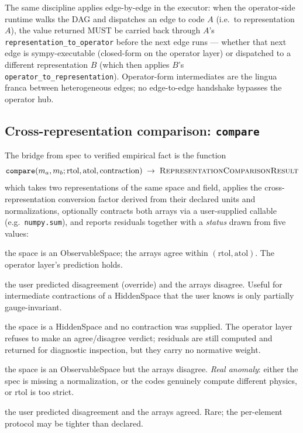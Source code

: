 \documentclass[11pt,a4paper]{article}
\begin{document}
The same discipline applies edge-by-edge in the executor: when the
operator-side runtime walks the DAG and dispatches an edge to code $A$
(i.e.\ to representation $A$), the value returned MUST be carried back
through $A$'s \texttt{representation\_to\_operator} before the
next edge runs --- whether that next edge is sympy-executable (closed-form
on the operator layer) or dispatched to a different representation $B$
(which then applies $B$'s
\texttt{operator\_to\_representation}). Operator-form intermediates
are the lingua franca between heterogeneous edges; no edge-to-edge handshake
bypasses the operator hub.

\subsection{Cross-representation comparison: \texttt{compare}}

The bridge from spec to verified empirical fact is the function
\begin{equation*}
  \texttt{compare}(m_a, m_b; \text{rtol}, \text{atol}, \text{contraction})
  \;\to\; \textsc{RepresentationComparisonResult}
\end{equation*}
which takes two representations of the same space and field, applies the cross-representation
conversion factor derived from their declared units and normalizations, optionally
contracts both arrays via a user-supplied callable (e.g.\ \texttt{numpy.sum}), and
reports residuals together with a \emph{status} drawn from five values:
\begin{description}[leftmargin=2.5em, itemsep=0.2em]
  \item[\textsc{Expected\_Agree}] the space is an ObservableSpace; the arrays agree within
        $(\text{rtol}, \text{atol})$. The operator layer's prediction holds.
  \item[\textsc{Expected\_Disagree}] the user predicted disagreement (override) and the
        arrays disagree. Useful for intermediate contractions of a HiddenSpace that the
        user knows is only partially gauge-invariant.
  \item[\textsc{Not\_Comparable}] the space is a HiddenSpace and no contraction was
        supplied. The operator layer refuses to make an agree/disagree verdict;
        residuals are still computed and returned for diagnostic inspection, but they
        carry no normative weight.
  \item[\textsc{Unexpected\_Disagree}] the space is an ObservableSpace but the arrays
        disagree. \emph{Real anomaly}: either the spec is missing a normalization, or the
        codes genuinely compute different physics, or rtol is too strict.
  \item[\textsc{Unexpected\_Agree}] the user predicted disagreement and the arrays
        agreed. Rare; the per-element protocol may be tighter than declared.
\end{description}
\end{document}
